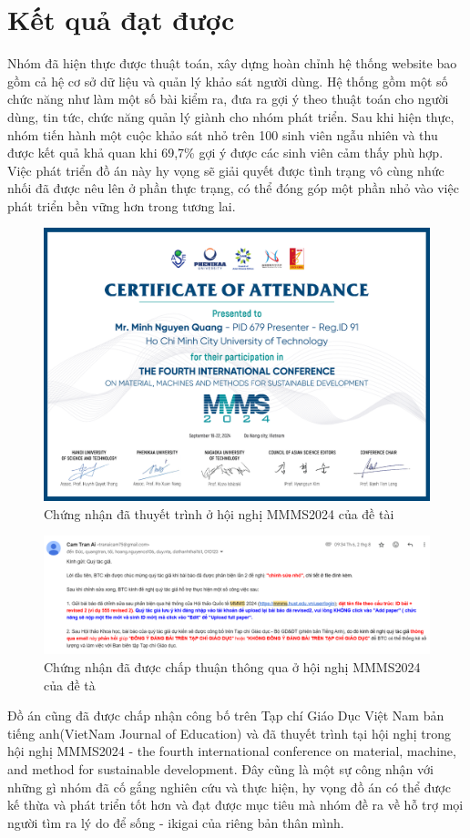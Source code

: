 \section{Kết quả đạt được}
    Nhóm đã hiện thực được thuật toán, xây dựng hoàn chỉnh hệ thống website bao gồm cả hệ cơ sở dữ liệu và quản lý khảo sát người dùng. Hệ thống gồm một số chức năng như làm một số bài kiểm ra, đưa ra gợi ý theo thuật toán cho người dùng, tin tức, chức năng quản lý giành cho nhóm phát triển. Sau khi hiện thực, nhóm tiến hành một cuộc khảo sát nhỏ trên 100 sinh viên ngẫu nhiên và thu được kết quả khả quan khi 69,7\% gợi ý được các sinh viên cảm thấy phù hợp. Việc phát triển đồ án này hy vọng sẽ giải quyết được tình trạng vô cùng nhức nhối đã được nêu lên ở phần thực trạng, có thể đóng góp một phần nhỏ vào việc phát triển bền vững hơn trong tương lai.
    
    \begin{figure}[H]
        \centering
        \includegraphics[width=0.8\linewidth, height=0.3\textheight]{images/present.png}
        \vspace{0.6cm}
        \caption{Chứng nhận đã thuyết trình ở hội nghị MMMS2024 của đề tài}
    \end{figure}

    \begin{figure}[H]
        \centering
        \includegraphics[width=0.8\linewidth]{images/email.png}
        \vspace{0.6cm}
        \caption{Chứng nhận đã được chấp thuận thông qua ở hội nghị MMMS2024 của đề tà}
    \end{figure}
    

    Đồ án cũng đã được chấp nhận công bố trên Tạp chí Giáo Dục Việt Nam bản tiếng anh(VietNam Journal of Education) và đã thuyết trình tại hội nghị trong hội nghị MMMS2024 - the fourth international conference on material, machine, and method for sustainable development. Đây cũng là một sự công nhận với những gì nhóm đã cố gắng nghiên cứu và thực hiện, hy vọng đồ án có thể được kế thừa và phát triển tốt hơn và đạt được mục tiêu mà nhóm đề ra về hỗ trợ mọi người tìm ra lý do để sống - ikigai của riêng bản thân mình.